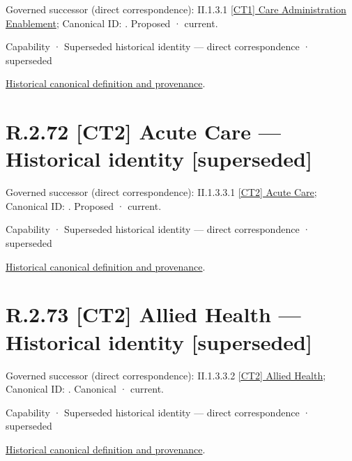 {\small Governed successor (direct correspondence): II.1.3.1 \hyperref[element:28df27d55c514a37995145ab46945f78]{[CT1] Care Administration Enablement}; Canonical ID: \texttt{}. Proposed · current.}\par
\label{element:b611a1fcfadb4b30af9ba74a4c993d8a}
{\small Capability · Superseded historical identity — direct correspondence · superseded}\par
\href{../../../../../../../continuum/strategy/capability/b611a1fcfadb4b30af9ba74a4c993d8a.md}{Historical canonical definition and provenance}.\par
\section*{R.2.72 [CT2] Acute Care — Historical identity [superseded]}
\label{navigation:R.2.72}

{\small Governed successor (direct correspondence): II.1.3.3.1 \hyperref[element:9bb988c526404522b83aeed5069e0eb5]{[CT2] Acute Care}; Canonical ID: \texttt{}. Proposed · current.}\par
\label{element:7b591957f7424424abc80f699e9f1960}
{\small Capability · Superseded historical identity — direct correspondence · superseded}\par
\href{../../../../../../../continuum/strategy/capability/7b591957f7424424abc80f699e9f1960.md}{Historical canonical definition and provenance}.\par
\section*{R.2.73 [CT2] Allied Health — Historical identity [superseded]}
\label{navigation:R.2.73}

{\small Governed successor (direct correspondence): II.1.3.3.2 \hyperref[element:63cd714a3e2a4354aa5383b189fea566]{[CT2] Allied Health}; Canonical ID: \texttt{}. Canonical · current.}\par
\label{element:6cd45c27d0c344b9807174dbd812d572}
{\small Capability · Superseded historical identity — direct correspondence · superseded}\par
\href{../../../../../../../continuum/strategy/capability/6cd45c27d0c344b9807174dbd812d572.md}{Historical canonical definition and provenance}.\par
